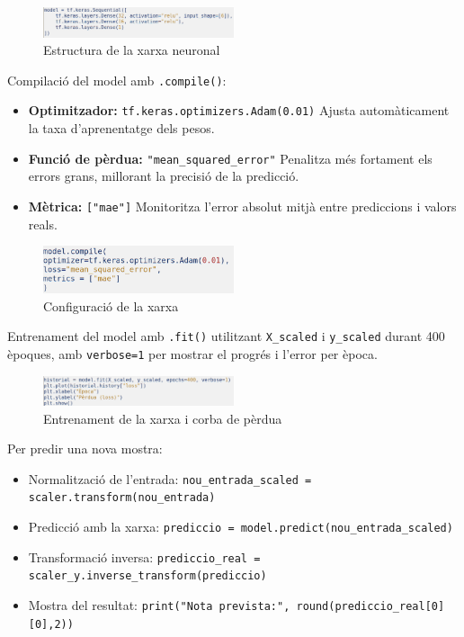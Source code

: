 \begin{figure}[H]
\centering
\includegraphics[width=0.5\textwidth]{./figures/26.png}
\caption{Estructura de la xarxa neuronal}
\end{figure}

Compilació del model amb \texttt{.compile()}:

\begin{itemize}
\item \textbf{Optimitzador:} \texttt{tf.keras.optimizers.Adam(0.01)}
Ajusta automàticament la taxa d’aprenentatge dels pesos.
\item \textbf{Funció de pèrdua:} \texttt{"mean\_squared\_error"}
Penalitza més fortament els errors grans, millorant la precisió de la predicció.
\item \textbf{Mètrica:} \texttt{["mae"]}
Monitoritza l’error absolut mitjà entre prediccions i valors reals.
\end{itemize}

\begin{figure}[H]
\centering
\includegraphics[width=0.5\textwidth]{./figures/27.png}
\caption{Configuració de la xarxa}
\end{figure}

Entrenament del model amb \texttt{.fit()} utilitzant \texttt{X\_scaled} i \texttt{y\_scaled} durant 400 èpoques, amb \texttt{verbose=1} per mostrar el progrés i l’error per època.

\begin{figure}[H]
\centering
\includegraphics[width=0.5\textwidth]{./figures/28.png}
\caption{Entrenament de la xarxa i corba de pèrdua}
\end{figure}

Per predir una nova mostra:

\begin{itemize}
\item Normalització de l’entrada: \texttt{nou\_entrada\_scaled = scaler.transform(nou\_entrada)}
\item Predicció amb la xarxa: \texttt{prediccio = model.predict(nou\_entrada\_scaled)}
\item Transformació inversa: \texttt{prediccio\_real = scaler\_y.inverse\_transform(prediccio)}
\item Mostra del resultat: \texttt{print("Nota prevista:", round(prediccio\_real[0][0],2))}
\end{itemize}


